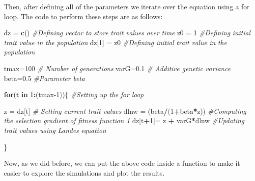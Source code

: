 \documentclass[
]{book}
\newenvironment{Shaded}{\begin{snugshade}}{\end{snugshade}}
\newcommand{\CommentTok}[1]{\textcolor[rgb]{0.56,0.35,0.01}{\textit{#1}}}
\newcommand{\ControlFlowTok}[1]{\textcolor[rgb]{0.13,0.29,0.53}{\textbf{#1}}}
\newcommand{\DecValTok}[1]{\textcolor[rgb]{0.00,0.00,0.81}{#1}}
\newcommand{\FloatTok}[1]{\textcolor[rgb]{0.00,0.00,0.81}{#1}}
\newcommand{\FunctionTok}[1]{\textcolor[rgb]{0.13,0.29,0.53}{\textbf{#1}}}
\newcommand{\NormalTok}[1]{#1}
\newcommand{\OtherTok}[1]{\textcolor[rgb]{0.56,0.35,0.01}{#1}}
\newcommand{\SpecialCharTok}[1]{\textcolor[rgb]{0.81,0.36,0.00}{\textbf{#1}}}
\begin{document}
Then, after defining all of the parameters we iterate over the equation using a for loop. The code to perform these steps are as follows:

\begin{Shaded}
\begin{Highlighting}[]
\NormalTok{dz }\OtherTok{=} \FunctionTok{c}\NormalTok{() }\CommentTok{\#Defining vector to store trait values over time}
\NormalTok{z0 }\OtherTok{=} \DecValTok{1} \CommentTok{\#Defining initial trait value in the population}
\NormalTok{dz[}\DecValTok{1}\NormalTok{] }\OtherTok{=}\NormalTok{ z0 }\CommentTok{\#Defining initial trait value in the population}

\NormalTok{tmax}\OtherTok{=}\DecValTok{100} \CommentTok{\# Number of generations}
\NormalTok{varG}\OtherTok{=}\FloatTok{0.1} \CommentTok{\# Additive genetic variance}
\NormalTok{beta}\OtherTok{=}\FloatTok{0.5} \CommentTok{\#Parameter beta}

\ControlFlowTok{for}\NormalTok{(t }\ControlFlowTok{in} \DecValTok{1}\SpecialCharTok{:}\NormalTok{(tmax}\DecValTok{{-}1}\NormalTok{))\{ }\CommentTok{\#Setting up the for loop}
  
\NormalTok{  z }\OtherTok{=}\NormalTok{ dz[t] }\CommentTok{\# Setting current trait values}
\NormalTok{  dlnw }\OtherTok{=}\NormalTok{ (beta}\SpecialCharTok{/}\NormalTok{(}\DecValTok{1}\SpecialCharTok{+}\NormalTok{beta}\SpecialCharTok{*}\NormalTok{z))  }\CommentTok{\#Computing the selection gradient of fitness function 1}
\NormalTok{  dz[t}\SpecialCharTok{+}\DecValTok{1}\NormalTok{]}\OtherTok{=}\NormalTok{ z }\SpecialCharTok{+}\NormalTok{ varG}\SpecialCharTok{*}\NormalTok{dlnw }\CommentTok{\#Updating trait values using Lande\textquotesingle{}s equation}
  
\NormalTok{\}}
\end{Highlighting}
\end{Shaded}

Now, as we did before, we can put the above code inside a function to make it easier to explore the simulations and plot the results.
\end{document}
